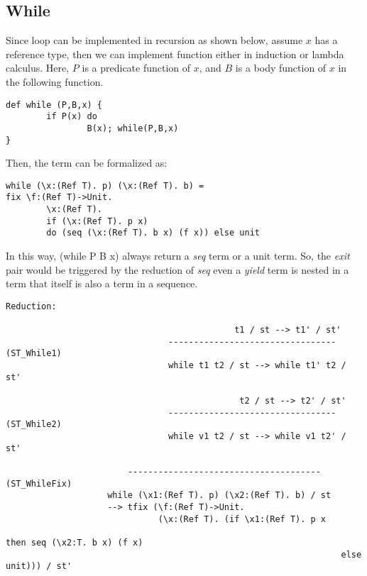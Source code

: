\subsection{While}
Since \while loop can be implemented in recursion as shown below, assume $x$ has a reference type, then we can implement \while function either in induction or lambda calculus. Here, $P$ is a predicate function of $x$, and $B$ is a body function of $x$ in the following function.
\begin{lstlisting}
def while (P,B,x) {
		if P(x) do
				B(x); while(P,B,x)
}
\end{lstlisting}
Then, the \while term can be formalized as:
\begin{lstlisting}
while (\x:(Ref T). p) (\x:(Ref T). b) =
fix \f:(Ref T)->Unit. 
		\x:(Ref T). 
		if (\x:(Ref T). p x) 
		do (seq (\x:(Ref T). b x) (f x)) else unit
\end{lstlisting}
In this way, (while P B x) always return a \textit{seq} term or a unit term. So, the \textit{exit} pair would be triggered by the reduction of \textit{seq} even a \textit{yield} term is nested in a \while term that itself is also a term in a sequence.
\begin{lstlisting}
Reduction:

										     t1 / st --> t1' / st'
								--------------------------------- (ST_While1)
								while t1 t2 / st --> while t1' t2 / st'
								
											  t2 / st --> t2' / st'
								--------------------------------- (ST_While2)
								while v1 t2 / st --> while v1 t2' / st'
								
						-------------------------------------- (ST_WhileFix)
					while (\x1:(Ref T). p) (\x2:(Ref T). b) / st 
					--> tfix (\f:(Ref T)->Unit. 
					       	  (\x:(Ref T). (if \x1:(Ref T). p x
																	then seq (\x2:T. b x) (f x)
																  else unit))) / st'
\end{lstlisting}


